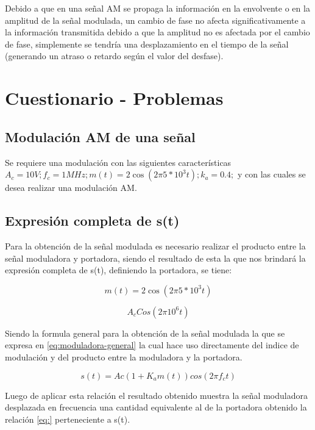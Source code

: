 \documentclass[conference]{IEEEtran}
\begin{document}
	Debido a que en una señal AM se propaga la información en la envolvente o en la amplitud de la señal modulada, un cambio de fase no afecta significativamente a la información transmitida debido a que la amplitud no es afectada por el cambio de fase, simplemente se tendría una desplazamiento en el tiempo de la señal (generando un atraso o retardo según el valor del desfase).
	
	\section{Cuestionario - Problemas}
	
	\subsection{\textbf{Modulación AM de una señal}}
	Se requiere una modulación con las siguientes características $A_c = 10V; f_c = 1MHz; m(t) = 2\cos(2\pi5*10^3t); k_a = 0.4;$ y con las cuales se desea realizar una modulación AM.
	\subsection{\textbf{Expresión completa de s(t)}}
	
	Para la obtención de la señal modulada es necesario realizar el producto entre la señal moduladora y portadora, siendo el resultado de esta la que nos brindará la expresión completa de s(t), definiendo la portadora, se tiene:
	
	\begin{equation}
		m(t) = 2\cos(2\pi5*10^3t)
		\label{eq:moduladora}	
	\end{equation}
	
	\begin{equation}
		A_cCos(2\pi10^6t)
		\label{eq:portadora}
	\end{equation}
	
	Siendo la formula general para la obtención de la señal modulada la que se expresa en \ref{eq:moduladora-general} la cual hace uso directamente del indice de modulación y del producto entre la moduladora y la portadora.
	
	\begin{equation}
		s(t) = Ac(1 + K_am(t))cos(2\pi f_ct)
		\label{eq:moduladora-general}
	\end{equation}
	
	Luego de aplicar esta relación el resultado obtenido muestra la señal moduladora desplazada en frecuencia una cantidad equivalente al de la portadora obtenido la relación \ref{eq:} perteneciente a s(t).
	
\end{document}
